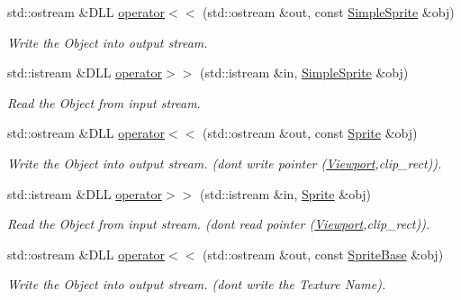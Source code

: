 \begin{DoxyCompactItemize}
std::ostream \&DLL \hyperlink{namespace_f2_c_a897c7619870a9d8aa78fe93deea683c3}{operator$<$$<$} (std::ostream \&out, const \hyperlink{class_f2_c_1_1_simple_sprite}{SimpleSprite} \&obj)
\begin{DoxyCompactList}\small\item\em Write the Object into output stream. \item\end{DoxyCompactList}\item 
std::istream \&DLL \hyperlink{namespace_f2_c_adc01c049f9bcc3513fc783439f0aaabf}{operator$>$$>$} (std::istream \&in, \hyperlink{class_f2_c_1_1_simple_sprite}{SimpleSprite} \&obj)
\begin{DoxyCompactList}\small\item\em Read the Object from input stream. \item\end{DoxyCompactList}\item 
std::ostream \&DLL \hyperlink{namespace_f2_c_a065c5287041960b09d010526bb222148}{operator$<$$<$} (std::ostream \&out, const \hyperlink{class_f2_c_1_1_sprite}{Sprite} \&obj)
\begin{DoxyCompactList}\small\item\em Write the Object into output stream. (dont write pointer (\hyperlink{class_f2_c_1_1_viewport}{Viewport},clip\_\-rect)). \item\end{DoxyCompactList}\item 
std::istream \&DLL \hyperlink{namespace_f2_c_a1dd141584e11ee13c4454bfa3afbafcb}{operator$>$$>$} (std::istream \&in, \hyperlink{class_f2_c_1_1_sprite}{Sprite} \&obj)
\begin{DoxyCompactList}\small\item\em Read the Object from input stream. (dont read pointer (\hyperlink{class_f2_c_1_1_viewport}{Viewport},clip\_\-rect)). \item\end{DoxyCompactList}\item 
std::ostream \&DLL \hyperlink{namespace_f2_c_a5349567ddf35cf232e24cf4e03b7e921}{operator$<$$<$} (std::ostream \&out, const \hyperlink{class_f2_c_1_1_sprite_base}{SpriteBase} \&obj)
\begin{DoxyCompactList}\small\item\em Write the Object into output stream. (dont write the Texture Name). \item\end{DoxyCompactList}\item 

\end{DoxyCompactItemize}
